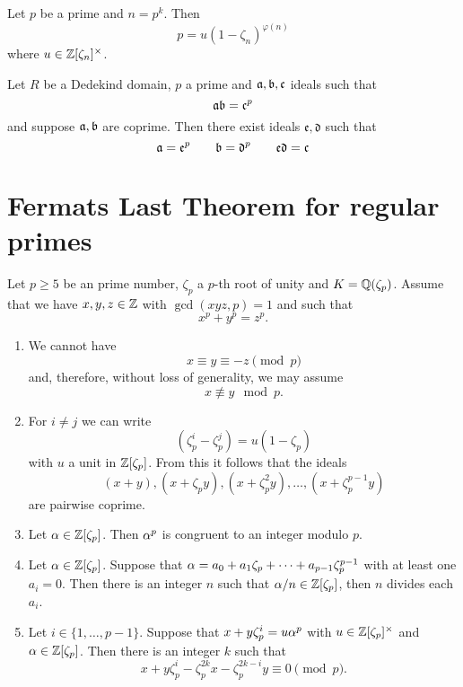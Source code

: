 \begin{lemma}\label{lemma:_fac_of_p_in_p_th_root}
	Let $p$ be a prime and $n=p^k$. Then \[p=u(1-\zeta_n)^{\varphi(n)}\] where $u \in \mathbb{Z}[\zeta_n]^{\times}$.
\end{lemma}

\begin{lemma}\label{lemma:_ideals_mult_to_power}
	Let $R$ be a Dedekind domain, $p$ a prime and $\mathfrak{a},\mathfrak{b},\mathfrak{c}$ ideals such that \[\mathfrak{a}\mathfrak{b}=\mathfrak{c}^p\] and suppose $\mathfrak{a},\mathfrak{b}$ are coprime. Then there exist ideals $\mathfrak{e},\mathfrak{d}$ such that \[\mathfrak{a}=\mathfrak{e}^p \qquad \mathfrak{b}=\mathfrak{d}^p \qquad \mathfrak{e}\mathfrak{d}=\mathfrak{c}\] 
\end{lemma}


\section{Fermats Last Theorem for regular primes}

\begin{theorem}\label{theorem:FLT_facts}
	
	Let $p \geq 5$ be an prime number, $\zeta_p$ a $p$-th root of unity and $K=\mathbb{Q}(\zeta_p)$.  Assume that we have $x,y,z \in \mathbb{Z}$ with $\gcd(xyz,p)=1$ and such that \[x^p+y^p=z^p.\] 
	
	\begin{enumerate}
		\item We cannot have  \[x \equiv y \equiv -z \pmod p\] and, therefore, without loss of generality, we may assume \[x \not \equiv y \mod p.\]
		
		\item For $i \neq j$ we can write \[(\zeta_p^i-\zeta_p^j)=u(1-\zeta_p)\] with $u$ a unit in $\mathbb{Z}[\zeta_p]$. From this it follows that the ideals \[(x+y),(x+\zeta_py),(x+\zeta_p^2y),\dots,(x+\zeta_p^{p-1}y)\] are pairwise coprime. 
		
		\item Let $\alpha \in \mathbb{Z}[\zeta_p]$. Then $\alpha^p$ is congruent to an integer modulo $p$.
		
		\item Let $\alpha \in \mathbb{Z}[\zeta_p]$.   Suppose that $\alpha=a_0+a_1\zeta_p+\cdots+a_{p-1}\zeta_p^{p-1}$ with at least one $a_i=0$. Then there is an integer $n$ such that $\alpha/n \in \mathbb{Z}[\zeta_p]$, then $n$ divides each $a_i$. 
		
		
		\item   Let $i \in \{1,\dots,p-1\}.$ Suppose that $x+y\zeta_p^i=u \alpha^p$ with $u \in \mathbb{Z}[\zeta_p]^\times$ and $\alpha \in \mathbb{Z}[\zeta_p]$. Then there is an integer $k$ such that \[x+y\zeta_p^i-\zeta_p^{2k}x-\zeta_p^{2k-i}y \equiv 0 \pmod p.\]
		
		
	\end{enumerate}
	
\end{theorem}



